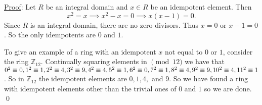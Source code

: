 \documentclass{article}
\begin{document}
\underline{Proof}: Let $R$ be an integral domain and $x \in R$ be an idempotent element. Then 
$$ x^2 = x \implies x^2 - x = 0 \implies x(x-1) = 0.$$
Since $R$ is an integral domain, there are no zero divisors. Thus $x = 0$ or $x-1 = 0$. So the only idempotents are $0$ and $1$. 

To give an example of a ring with an idempotent $x$ not equal to $0$ or $1$, consider the ring $\mathbb{Z}_{12}$. Continually squaring elements in $\pmod {12}$ we have that $0^2 \equiv 0, 1^2 \equiv 1, 2^2 \equiv 4, 3^2 \equiv 9, 4^2 \equiv 4, 5^2 \equiv 1, 6^2 \equiv 0, 7^2 \equiv 1, \linebreak 8^2 \equiv 4, 9^2 \equiv 9, 10^2 \equiv 4, 11^2 \equiv 1$. So in $\mathbb{Z}_{12}$ the idempotent elements are $0, 1, 4,$ and $9$. So we have found a ring with idempotent elements other than the trivial ones of $0$ and $1$ so we are done. \qed \\
\end{document}
